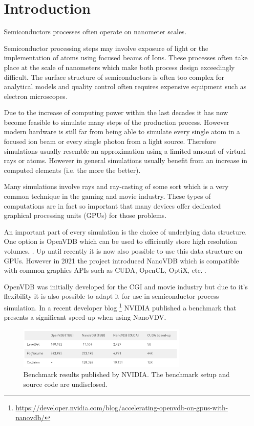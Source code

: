 \section{Introduction}
Semiconductors processes often operate on nanometer scales. 


Semiconductor processing steps may involve exposure of light or the implementation of atoms using focused beams of Ions.
These processes often take place at the scale of nanometers which make both process design exceedingly difficult.
The surface structure of semiconductors is often too complex for analytical models and quality control often requires expensive equipment such as electron microscopes.

Due to the increase of computing power within the last decades it has now become feasible to simulate many steps of the production process.
However modern hardware is still far from being able to simulate every single atom in a focused ion beam or every single photon from a light source.
Therefore simulations usually resemble an approximation using a limited amount of virtual rays or atoms. 
However in general simulations usually benefit from an increase in computed elements (i.e. the more the better).

Many simulations involve rays and ray-casting of some sort which is a very common technique in the gaming and movie industry.
These types of computations are in fact so important that many devices offer dedicated graphical processing units (GPUs) for those problems.



An important part of every simulation is the choice of underlying data structure. 
One option is OpenVDB which can be used to efficiently store high resolution volumes. \cite{openvdb}.
Up until recently it is now also possible to use this data structure on GPUs.
However in 2021 the project introduced NanoVDB which is compatible with common graphics APIs such as CUDA, OpenCL, OptiX, etc. \cite{nanovdb}.

OpenVDB was initially developed for the CGI and movie industry but due to it's flexibility it is also possible to adapt it for use in semiconductor process simulation.
In a recent developer blog \footnote{\url{https://developer.nvidia.com/blog/accelerating-openvdb-on-gpus-with-nanovdb/}} NVIDIA published a benchmark that
presents a significant speed-up when using NanoVDV.

\begin{figure}[H]
	\centering
	\includegraphics[width=0.75\textwidth]{res/nvidia_benchmark.png}
	\caption{Benchmark results published by NVIDIA. The benchmark setup and source code are undisclosed. \cite{nanovdb_nvidia}}
	\label{fig::nvidia_benchmark}
\end{figure}


